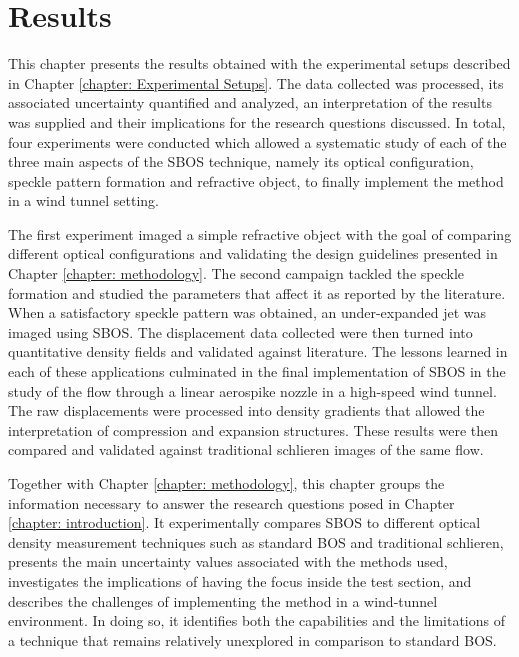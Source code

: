 \chapter{Results}
\label{chapter: Results}

This chapter presents the results obtained with the experimental setups described in Chapter \ref{chapter: Experimental Setups}. The data collected was processed, its associated uncertainty quantified and analyzed, an interpretation of the results was supplied and their implications for the research questions discussed. In total, four experiments were conducted which allowed a systematic study of each of the three main aspects of the SBOS technique, namely its optical configuration, speckle pattern formation and refractive object, to finally implement the method in a wind tunnel setting.

The first experiment imaged a simple refractive object with the goal of comparing different optical configurations and validating the design guidelines presented in Chapter \ref{chapter: methodology}. The second campaign tackled the speckle formation and studied the parameters that affect it as reported by the literature. When a satisfactory speckle pattern was obtained, an under-expanded jet was imaged using SBOS. The displacement data collected were then turned into quantitative density fields and validated against literature. The lessons learned in each of these applications culminated in the final implementation of SBOS in the study of the flow through a linear aerospike nozzle in a high-speed wind tunnel. The raw displacements were processed into density gradients that allowed the interpretation of compression and expansion structures. These results were then compared and validated against traditional schlieren images of the same flow.

Together with Chapter \ref{chapter: methodology}, this chapter groups the information necessary to answer the research questions posed in Chapter \ref{chapter: introduction}. It experimentally compares SBOS to different optical density measurement techniques such as standard BOS and traditional schlieren, presents the main uncertainty values associated with the methods used, investigates the implications of having the focus inside the test section, and describes the challenges of implementing the method in a wind-tunnel environment. In doing so, it identifies both the capabilities and the limitations of a technique that remains relatively unexplored in comparison to standard BOS.

